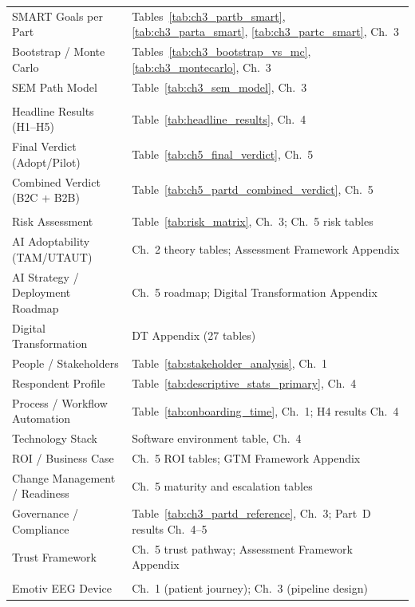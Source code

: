 \documentclass[12pt,a4paper,oneside]{report}
\begin{document}
\begin{tabularx}{\textwidth}{@{} >{\raggedright\arraybackslash}p{4.0cm} L @{}}
SMART Goals per Part & Tables~\ref{tab:ch3_partb_smart}, \ref{tab:ch3_parta_smart}, \ref{tab:ch3_partc_smart}, Ch.~3 \\
Bootstrap / Monte Carlo & Tables~\ref{tab:ch3_bootstrap_vs_mc}, \ref{tab:ch3_montecarlo}, Ch.~3 \\
SEM Path Model & Table~\ref{tab:ch3_sem_model}, Ch.~3 \\
\midrule
{} \\
\addlinespace
Headline Results (H1--H5) & Table~\ref{tab:headline_results}, Ch.~4 \\
Final Verdict (Adopt/Pilot) & Table~\ref{tab:ch5_final_verdict}, Ch.~5 \\
Combined Verdict (B2C + B2B) & Table~\ref{tab:ch5_partd_combined_verdict}, Ch.~5 \\
\midrule
{} \\
\addlinespace
Risk Assessment & Table~\ref{tab:risk_matrix}, Ch.~3; Ch.~5 risk tables \\
AI Adoptability (TAM/UTAUT) & Ch.~2 theory tables; Assessment Framework Appendix \\
AI Strategy / Deployment Roadmap & Ch.~5 roadmap; Digital Transformation Appendix \\
Digital Transformation & DT Appendix (27 tables) \\
People / Stakeholders & Table~\ref{tab:stakeholder_analysis}, Ch.~1 \\
Respondent Profile & Table~\ref{tab:descriptive_stats_primary}, Ch.~4 \\
Process / Workflow Automation & Table~\ref{tab:onboarding_time}, Ch.~1; H4 results Ch.~4 \\
Technology Stack & Software environment table, Ch.~4 \\
ROI / Business Case & Ch.~5 ROI tables; GTM Framework Appendix \\
Change Management / Readiness & Ch.~5 maturity and escalation tables \\
Governance / Compliance & Table~\ref{tab:ch3_partd_reference}, Ch.~3; Part~D results Ch.~4--5 \\
Trust Framework & Ch.~5 trust pathway; Assessment Framework Appendix \\
\midrule
{} \\
\addlinespace
Emotiv EEG Device & Ch.~1 (patient journey); Ch.~3 (pipeline design) \\

\end{tabularx}
\end{document}
